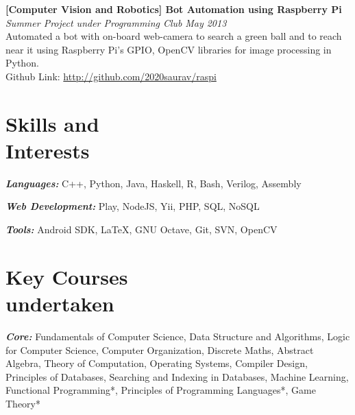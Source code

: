 \documentclass[margin,10pt]{resume}
\begin{document}
\begin{resume}
\begin{list2}

\item\textbf{[Computer Vision and Robotics] Bot Automation using Raspberry Pi} \\
    \textsl{Summer Project under Programming Club} \hfill \emph{May 2013}\\
	Automated a bot with on-board web-camera to search a green ball and to reach near it using Raspberry Pi's GPIO, OpenCV libraries for image processing in Python.\\
	Github Link: \url{http://github.com/2020saurav/raspi}

\end{list2}

\section{\mysidestyle Skills and\\Interests}
\begin{list2}
	\item \emph{\textbf {Languages:}} C++, Python, Java, Haskell, R, Bash, Verilog, Assembly
	\vspace{1mm}
	\item \emph{\textbf{Web Development:}} Play, NodeJS, Yii, PHP, SQL, NoSQL
	\vspace{1mm}
	\item \emph{\textbf{Tools:}} Android SDK, \LaTeX, GNU Octave, Git, SVN, OpenCV
\end{list2}


\section{\mysidestyle Key Courses\\undertaken } 
\begin{list2}
	\item \emph{\textbf{Core:}} Fundamentals of Computer Science, Data Structure and Algorithms, Logic for Computer Science, Computer Organization, Discrete Maths, Abstract Algebra, Theory of Computation, Operating Systems, Compiler Design, Principles of Databases, Searching and Indexing in Databases, Machine Learning, Functional Programming*, Principles of Programming Languages*, Game Theory*


\end{list2}
\end{resume}
\end{document}
